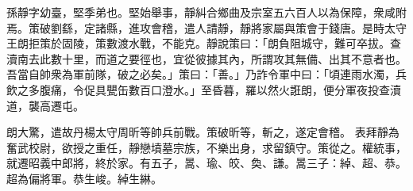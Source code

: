 \begin{pinyinscope}
 
 
 孫靜字幼臺，堅季弟也。堅始舉事，靜糾合鄉曲及宗室五六百人以為保障，衆咸附焉。策破劉繇，定諸縣，進攻會稽，遣人請靜，靜將家屬與策會于錢唐。是時太守王朗拒策於固陵，策數渡水戰，不能克。靜說策曰：「朗負阻城守，難可卒拔。查瀆南去此數十里，而道之要徑也，宜從彼據其內，所謂攻其無備、出其不意者也。吾當自帥衆為軍前隊，破之必矣。」策曰：「善。」乃詐令軍中曰：「頃連雨水濁，兵飲之多腹痛，令促具甖缶數百口澄水。」至昏暮，羅以然火誑朗，便分軍夜投查瀆道，襲高遷屯。
 
 
 朗大驚，遣故丹楊太守周昕等帥兵前戰。策破昕等，斬之，遂定會稽。
 表拜靜為奮武校尉，欲授之重任，靜戀墳墓宗族，不樂出身，求留鎮守。策從之。權統事，就遷昭義中郎將，終於家。有五子，暠、瑜、皎、奐、謙。暠三子：綽、超、恭。超為偏將軍。恭生峻。綽生綝。
 
 
\end{pinyinscope}